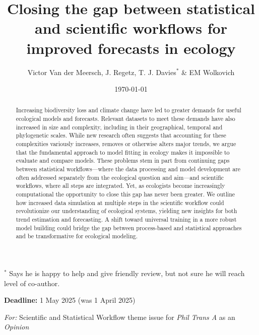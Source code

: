 \documentclass[11pt]{article}
\begin{document}
\title{Closing the gap between statistical and scientific workflows for improved forecasts in ecology } 
\date{\today}
\author{Victor Van der Meersch, J. Regetz, T. J. Davies$^*$ \& EM Wolkovich}
\maketitle
$^*$ Says he is happy to help and give friendly review, but not sure he will reach level of co-author. 

{\bf Deadline:} 1 May 2025 (was 1 April 2025)

\emph{For:} Scientific and Statistical Workflow theme issue for \emph{Phil Trans A} as an \emph{Opinion}


\begin{abstract}
Increasing biodiversity loss and climate change have led to greater demands for useful ecological models and forecasts. Relevant datasets to meet these demands have also increased in size and complexity, including in their geographical, temporal and phylogenetic scales. While new research often suggests that accounting for these complexities variously increases, removes or otherwise alters major trends, we argue that the fundamental approach to model fitting in ecology makes it impossible to evaluate and compare models. These problems stem in part from continuing gaps between statistical workflows---where the data processing and model development are often addressed separately from the ecological question and aim---and scientific workflows, where all steps are integrated. Yet, as ecologists become increasingly computational the opportunity to close this gap has never been greater. We outline how increased data simulation at multiple steps in the scientific workflow could revolutionize our understanding of ecological systems, yielding new insights for both trend estimation and forecasting.
A shift toward universal training in a more robust model building could bridge the gap between process-based and statistical approaches and be transformative for ecological modeling.
\end{abstract}
\end{document}
